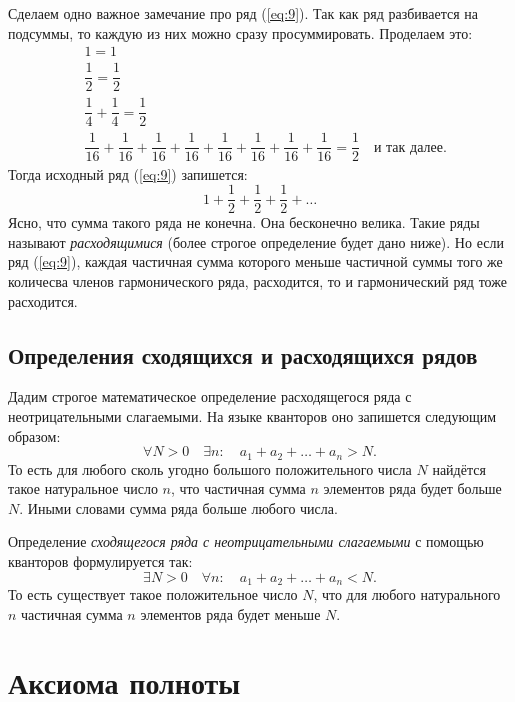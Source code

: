 \documentclass[12pt]{article}
\begin{document}
\par
Сделаем одно важное замечание про ряд (\ref{eq:9}). Так как ряд разбивается на подсуммы, то каждую из них можно сразу просуммировать. Проделаем это:
\begin{equation}
    \begin{split}
        &1 = 1\\
        &\dfrac{1}{2} = \dfrac{1}{2}\\
        &\dfrac{1}{4} + \dfrac{1}{4} = \dfrac{1}{2}\\
        &\dfrac1{16}+ \dfrac1{16}+ \dfrac1{16}+ \dfrac1{16} + \dfrac1{16}+ \dfrac1{16}+ \dfrac1{16}+ \dfrac1{16} = \dfrac{1}{2} \quad \text{и так далее.}
    \end{split}
\end{equation}
Тогда исходный ряд (\ref{eq:9}) запишется:
\begin{equation}
    1 + \dfrac12 + \dfrac12 + \dfrac12 + \ldots
\end{equation}
Ясно, что сумма такого ряда не конечна. Она бесконечно велика. Такие ряды называют \emph{расходящимися} (более строгое определение будет дано ниже). Но если ряд (\ref{eq:9}), каждая частичная сумма которого меньше частичной суммы того же количесва членов гармонического ряда, расходится, то и гармонический ряд тоже расходится.
\subsection{Определения сходящихся и расходящихся рядов}
Дадим строгое математическое определение расходящегося ряда с неотрицательными слагаемыми. На языке кванторов оно запишется следующим образом:
\begin{equation}
    \forall N > 0 \quad \exists n: \quad a_1 + a_2 + \ldots + a_n > N.
\end{equation}
То есть для любого сколь угодно большого положительного числа $N$ найдётся такое натуральное число $n$, что частичная сумма $n$ элементов ряда будет больше $N$. Иными словами сумма ряда больше любого числа.
\par
Определение \emph{сходящегося ряда с неотрицательными слагаемыми} с помощью кванторов формулируется так:
\begin{equation}
    \exists N > 0 \quad \forall n: \quad a_1 + a_2 + \ldots + a_n < N.
\end{equation}
То есть существует такое положительное число $N$, что для любого натурального $n$ частичная сумма $n$ элементов ряда будет меньше $N$.
\section{Аксиома полноты}
\end{document}
